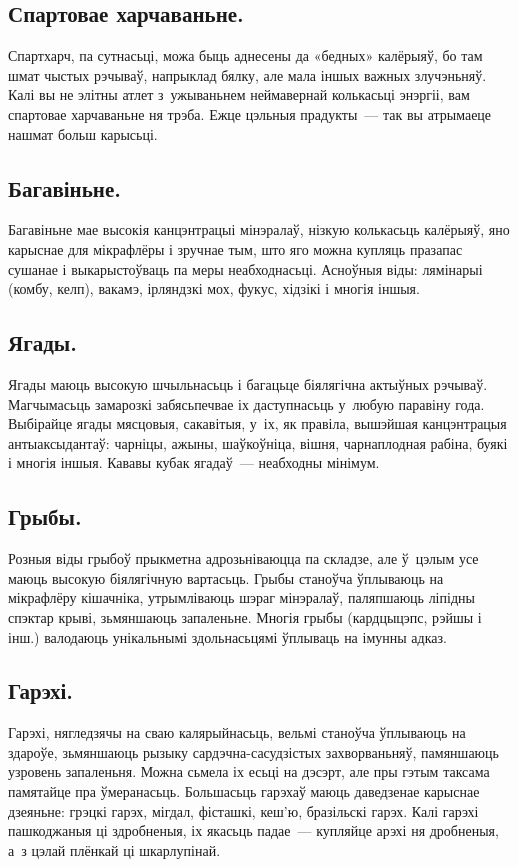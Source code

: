 \subsection{Спартовае харчаваньне.}
Спартхарч, па сутнасьці, можа быць аднесены да «бедных» калёрыяў, бо там шмат чыстых рэчываў, напрыклад бялку, але мала іншых важных злучэньняў. Калі вы не элітны атлет з~ужываньнем неймавернай колькасьці энэргіі, вам спартовае харчаваньне ня трэба. Ежце цэльныя прадукты~--- так вы атрымаеце нашмат больш карысьці.

\subsection{Багавіньне.}
Багавіньне мае высокія канцэнтрацыі мінэралаў, нізкую колькасьць калёрыяў, яно карыснае для мікрафлёры і зручнае тым, што яго можна купляць празапас сушанае і выкарыстоўваць па меры неабходнасьці. Асноўныя віды: лямінарыі (комбу, келп), вакамэ, ірляндзкі мох, фукус, хідзікі і многія іншыя.

\subsection{Ягады.}
Ягады маюць высокую шчыльнасьць і багацьце біялягічна актыўных рэчываў. Магчымасьць замарозкі забясьпечвае іх даступнасьць у~любую паравіну года. Выбірайце ягады мясцовыя, сакавітыя, у~іх, як правіла, вышэйшая канцэнтрацыя антыаксыдантаў: чарніцы, ажыны, шаўкоўніца, вішня, чарнаплодная рабіна, буякі і многія іншыя. Кававы кубак ягадаў~--- неабходны мінімум.

\subsection{Грыбы.}
Розныя віды грыбоў прыкметна адрозьніваюцца па складзе, але ў~цэлым усе маюць высокую біялягічную вартасьць. Грыбы станоўча ўплываюць на мікрафлёру кішачніка, утрымліваюць шэраг мінэралаў, паляпшаюць ліпідны спэктар крыві, зьмяншаюць запаленьне. Многія грыбы (кардцыцэпс, рэйшы і інш.) валодаюць унікальнымі здольнасьцямі ўплываць на імунны адказ.

\subsection{Гарэхі.}
Гарэхі, нягледзячы на сваю калярыйнасьць, вельмі станоўча ўплываюць на здароўе, зьмяншаюць рызыку сардэчна-сасудзістых захворваньняў, памяншаюць узровень запаленьня. Можна сьмела іх есьці на дэсэрт, але пры гэтым таксама памятайце пра ўмеранасьць. Большасьць гарэхаў маюць даведзенае карыснае дзеяньне: грэцкі гарэх, мігдал, фісташкі, кеш'ю, бразільскі гарэх. Калі гарэхі пашкоджаныя ці здробненыя, іх якасьць падае~--- купляйце арэхі ня дробненыя, а~з цэлай плёнкай ці шкарлупінай.


